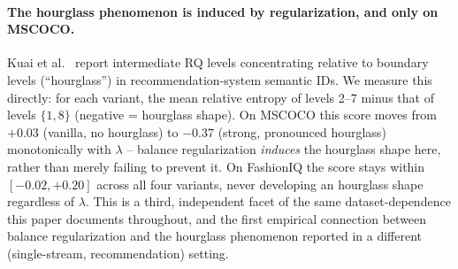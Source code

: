 \paragraph{The hourglass phenomenon is induced by regularization, and only on MSCOCO.} Kuai et al.~\cite{kuai2024hourglass} report intermediate RQ levels concentrating relative to boundary levels (``hourglass'') in recommendation-system semantic IDs. We measure this directly: for each variant, the mean relative entropy of levels 2--7 minus that of levels $\{1,8\}$ (negative = hourglass shape). On MSCOCO this score moves from $+0.03$ (vanilla, no hourglass) to $-0.37$ (strong, pronounced hourglass) monotonically with $\lambda$ -- balance regularization \emph{induces} the hourglass shape here, rather than merely failing to prevent it. On FashionIQ the score stays within $[-0.02, +0.20]$ across all four variants, never developing an hourglass shape regardless of $\lambda$. This is a third, independent facet of the same dataset-dependence this paper documents throughout, and the first empirical connection between balance regularization and the hourglass phenomenon reported in a different (single-stream, recommendation) setting.
